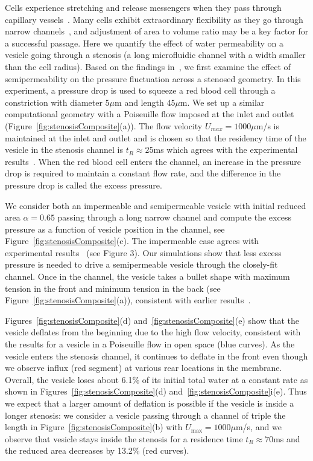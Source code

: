 \documentclass[9pt,twocolumn,twoside,lineno]{pnas-new}
\begin{document}
Cells experience stretching and release messengers when they pass
through capillary vessels~\cite{Wan2008_PNAS, ForsythWan2011_PNAS,
Pak2015_PNAS}. Many cells exhibit extraordinary flexibility as they go
through narrow channels~\cite{AuStoreyMoore2016_PNAS}, and adjustment of
area to volume ratio may be a key factor for a successful passage.  Here
we quantify the effect of water permeability on a vesicle going through
a stenosis (a long microfluidic channel with a width smaller than the
cell radius).  Based on the findings in~\cite{abk-fai-sto2006}, we first
examine the effect of semipermeability on the pressure fluctuation
across a stenosed geometry. In this experiment, a pressure drop is used
to squeeze a red blood cell through a constriction with diameter $5\mu$m
and length $45\mu$m. We set up a similar computational geometry with a
Poiseuille flow imposed at the inlet and outlet
(Figure~\ref{fig:stenosisComposite}(a)). The flow velocity $U_{max} =
1000 \mu$m/s is maintained at the inlet and outlet and is chosen so that
the residency time of the vesicle in the stenosis channel is $t_R
\approx 25$ms which agrees with the experimental
results~\cite{abk-fai-sto2006}. When the red blood cell enters the
channel, an increase in the pressure drop is required to maintain a
constant flow rate, and the difference in the pressure drop is called
the excess pressure. 

We consider both an impermeable and semipermeable vesicle with initial
reduced area $\alpha = 0.65$ passing through a long narrow channel and
compute the excess pressure as a function of vesicle position in the
channel, see Figure~\ref{fig:stenosisComposite}(c). The impermeable case
agrees with experimental results~\cite{abk-fai-sto2006} (see Figure 3).
Our simulations show that less excess pressure is needed to drive a
semipermeable vesicle through the closely-fit channel. Once in the
channel, the vesicle takes a bullet shape with maximum tension in the
front and minimum tension in the back (see
Figure~\ref{fig:stenosisComposite}(a)), consistent with earlier
results~\cite{Pak2015_PNAS, HarmanBertrandJoos2017_CJP}.

Figures~\ref{fig:stenosisComposite}(d)
and~\ref{fig:stenosisComposite}(e) show that the vesicle deflates from
the beginning due to the high flow velocity, consistent with the results
for a vesicle in a Poiseuille flow in open space (blue curves). As the
vesicle enters the stenosis channel, it continues to deflate in the
front even though we observe influx (red segment) at various rear
locations in the membrane. Overall, the vesicle loses about 6.1\% of its
initial total water at a constant rate as shown in
Figures~\ref{fig:stenosisComposite}(d)
and~\ref{fig:stenosisComposite}i(e). Thus we expect that a larger amount
of deflation is possible if the vesicle is inside a longer stenosis: we
consider a vesicle passing through a channel of triple the length in
Figure~\ref{fig:stenosisComposite}(b) with $U_{\max}=1000\mu$m/s, and we
observe that vesicle stays inside the stenosis for a residence time $t_R
\approx 70$ms and the reduced area decreases by 13.2\% (red curves).
\end{document}

